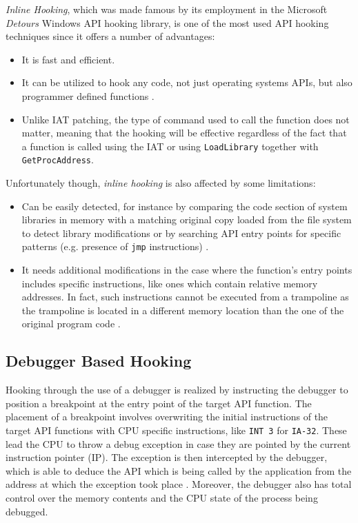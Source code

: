 \textit{Inline Hooking}, which was made famous by its employment  in the Microsoft \textit{Detours} Windows API hooking library, is one of the most used API hooking techniques since it offers a number of advantages:
\begin{itemize}
\item It is fast and efficient.
\item It can be utilized to hook any code, not just operating systems APIs, but also programmer defined functions \cite{Rootkit}. 
\item Unlike IAT patching, the type of command used to call the function does not matter, meaning that the hooking will be effective regardless of the fact that a function is called using the IAT or using \texttt{LoadLibrary} together with \texttt{GetProcAddress}.
\end{itemize} 

Unfortunately though, \textit{inline hooking} is also affected by some limitations:

\begin{itemize}
\item Can be easily detected, for instance by comparing the code section of system libraries in memory with a matching original copy loaded from the file system to detect library modifications \cite{Buescher:2011:BIS:2186328.2186347} or by searching API entry points for specific patterns (e.g. presence of \texttt{jmp} instructions) \cite{HookingDetection}.
\item It needs additional modifications in the case where the function's entry points includes specific instructions, like ones which contain relative memory addresses. In fact, such instructions cannot be executed from a trampoline as the trampoline is located in a different memory location than the one of the original program code \cite{Berdajs:2010:EAU:1815744.1815746}.
\end{itemize}

\subsection{Debugger Based Hooking}

Hooking through the use of a debugger is realized by instructing the debugger to position a breakpoint at the entry point of the target API function. The placement of a breakpoint involves overwriting the initial instructions of the target API functions with CPU specific instructions, like \texttt{INT 3} for \texttt{IA-32}. These lead the CPU to throw a debug exception in case they are pointed by the current instruction pointer (IP). The exception is then intercepted by the debugger, which is able to deduce the API which is being called by the application from the address at which the exception took place \cite{HookingDetection}. Moreover, the debugger also has total control over the memory contents and the CPU state of the process being debugged.

